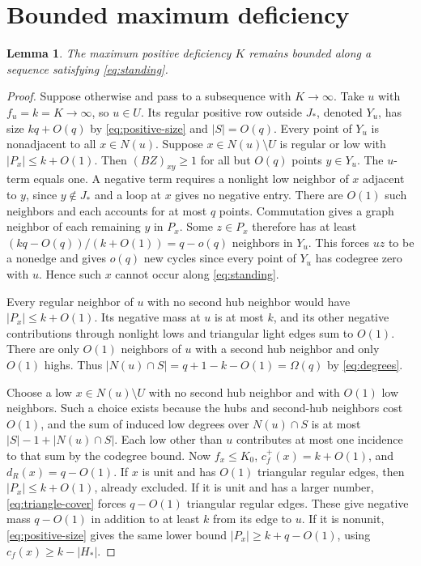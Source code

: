 \documentclass[11pt,reqno]{amsart}
\newtheorem{lemma}[theorem]{Lemma}
\theoremstyle{definition}
\theoremstyle{remark}
\numberwithin{equation}{section}
\begin{document}
\section{Bounded maximum deficiency}\label{sec:bounded}

\begin{lemma}\label{lem:bounded-deficiency}
The maximum positive deficiency \(K\) remains bounded along a sequence
satisfying \eqref{eq:standing}.
\end{lemma}
\begin{proof}
Suppose otherwise and pass to a subsequence with \(K\to\infty\).
Take \(u\) with \(f_u=k=K\to\infty\), so \(u\in U\). Its regular positive row outside \(J_*\), denoted \(Y_u\), has size \(kq+O(q)\) by \eqref{eq:positive-size} and \(|S|=O(q)\). Every point of \(Y_u\) is nonadjacent to all \(x\in N(u)\). Suppose \(x\in N(u)\setminus U\) is regular or low with \(|P_x|\le k+O(1)\). Then \((BZ)_{xy}\ge1\) for all but \(O(q)\) points \(y\in Y_u\). The \(u\)-term equals one. A negative term requires a nonlight low neighbor of \(x\) adjacent to \(y\), since \(y\notin J_*\) and a loop at \(x\) gives no negative entry. There are \(O(1)\) such neighbors and each accounts for at most \(q\) points. Commutation gives a graph neighbor of each remaining \(y\) in \(P_x\). Some \(z\in P_x\) therefore has at least \((kq-O(q))/(k+O(1))=q-o(q)\) neighbors in \(Y_u\). This forces \(uz\) to be a nonedge and gives \(o(q)\) new cycles since every point of \(Y_u\) has codegree zero with \(u\). Hence such \(x\) cannot occur along \eqref{eq:standing}.

Every regular neighbor of \(u\) with no second hub neighbor would have \(|P_x|\le k+O(1)\). Its negative mass at \(u\) is at most \(k\), and its other negative contributions through nonlight lows and triangular light edges sum to \(O(1)\). There are only \(O(1)\) neighbors of \(u\) with a second hub neighbor and only \(O(1)\) highs. Thus \(|N(u)\cap S|=q+1-k-O(1)=\Omega(q)\) by \eqref{eq:degrees}.

Choose a low \(x\in N(u)\setminus U\) with no second hub neighbor and with \(O(1)\) low neighbors. Such a choice exists because the hubs and second-hub neighbors cost \(O(1)\), and the sum of induced low degrees over \(N(u)\cap S\) is at most \(|S|-1+|N(u)\cap S|\). Each low other than \(u\) contributes at most one incidence to that sum by the codegree bound. Now \(f_x\le K_0\), \(c_f^+(x)=k+O(1)\), and \(d_R(x)=q-O(1)\). If \(x\) is unit and has \(O(1)\) triangular regular edges, then \(|P_x|\le k+O(1)\), already excluded. If it is unit and has a larger number, \eqref{eq:triangle-cover} forces \(q-O(1)\) triangular regular edges. These give negative mass \(q-O(1)\) in addition to at least \(k\) from its edge to \(u\). If it is nonunit, \eqref{eq:positive-size} gives the same lower bound \(|P_x|\ge k+q-O(1)\), using \(c_f(x)\ge k-|H_*|\).


\end{proof}
\end{document}

